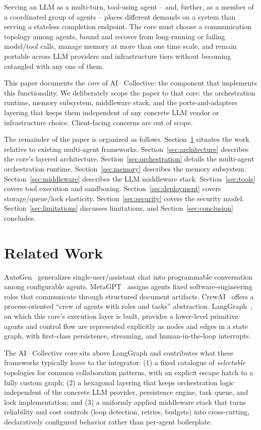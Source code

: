 \documentclass[conference]{IEEEtran}
\begin{document}
Serving an LLM as a multi-turn, tool-using agent -- and, further, as a
member of a coordinated group of agents -- places different demands on a
system than serving a stateless completion endpoint. The core must
choose a communication topology among agents, bound and recover from
long-running or failing model/tool calls, manage memory at more than one
time scale, and remain portable across LLM providers and infrastructure
tiers without becoming entangled with any one of them.

This paper documents the \emph{core} of AI\,--\,Collective: the component
that implements this functionality. We deliberately scope the paper to
that core: the orchestration runtime, memory subsystem, middleware stack, and
the ports-and-adapters layering that keeps them independent of any
concrete LLM vendor or infrastructure choice. Client-facing concerns are
out of scope.

The remainder of the paper is organized as follows.
Section~\ref{sec:related} situates the work relative to existing
multi-agent frameworks. Section~\ref{sec:architecture} describes the
core's layered architecture. Section~\ref{sec:orchestration} details the
multi-agent orchestration runtime. Section~\ref{sec:memory} describes the
memory subsystem. Section~\ref{sec:middleware} describes the LLM
middleware stack. Section~\ref{sec:tools} covers tool execution and
sandboxing. Section~\ref{sec:deployment} covers storage/queue/lock
elasticity. Section~\ref{sec:security} covers the security model.
Section~\ref{sec:limitations} discusses limitations, and
Section~\ref{sec:conclusion} concludes.

\section{Related Work}
\label{sec:related}

AutoGen~\cite{autogen} generalizes single-user/assistant chat into
programmable conversation among configurable agents. MetaGPT~\cite{metagpt}
assigns agents fixed software-engineering roles that communicate through
structured document artifacts. CrewAI~\cite{crewai} offers a
process-oriented ``crew of agents with roles and tasks'' abstraction.
LangGraph~\cite{langgraph}, on which this core's execution layer is
built, provides a lower-level primitive: agents and control flow are
represented explicitly as nodes and edges in a state graph, with
first-class persistence, streaming, and human-in-the-loop interrupts.

The AI\,--\,Collective core sits above LangGraph and contributes what
these frameworks typically leave to the integrator: (1) a fixed catalogue
of \emph{selectable} topologies for common collaboration patterns, with an
explicit escape hatch to a fully custom graph; (2) a hexagonal layering
that keeps orchestration logic independent of the concrete LLM provider,
persistence engine, task queue, and lock implementation; and (3) a
uniformly applied middleware stack that turns reliability and cost
controls (loop detection, retries, budgets) into cross-cutting,
declaratively configured behavior rather than per-agent boilerplate.
\end{document}
